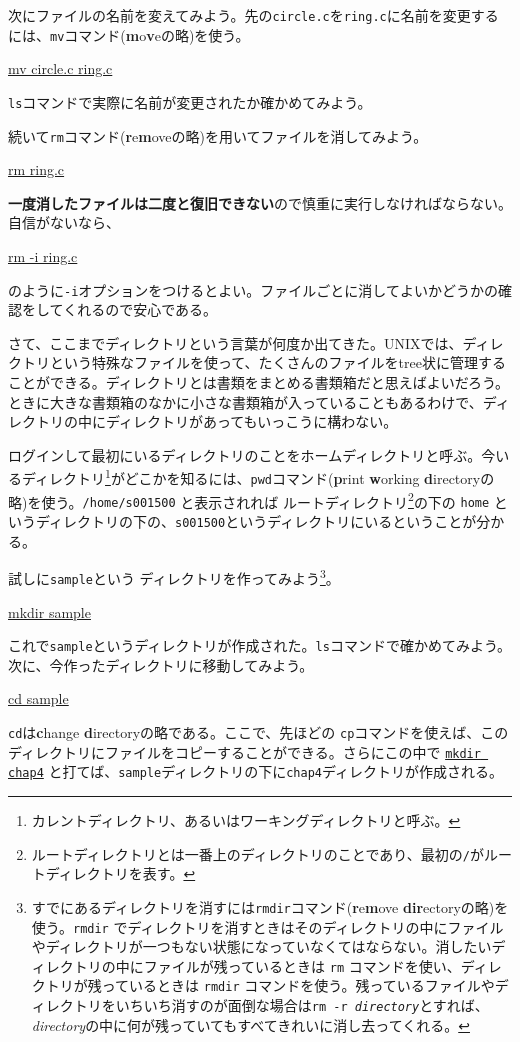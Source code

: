 次にファイルの名前を変えてみよう。先の{\tt circle.c}を{\tt ring.c}に名前を変更するには、{\tt mv}コマンド({\bf m}o{\bf v}eの略)を使う。
\begin{commandline2}
\prompt \underline{mv circle.c ring.c}
\end{commandline2} \noindent
{\tt ls}コマンドで実際に名前が変更されたか確かめてみよう。

続いて{\tt rm}コマンド({\bf r}e{\bf m}oveの略)を用いてファイルを消してみよう。
\begin{commandline2}
\prompt \underline{rm ring.c}
\end{commandline2} \noindent
{\bf 一度消したファイルは二度と復旧できない}ので慎重に実行しなければならない。自信がないなら、
\begin{commandline2}
\prompt \underline{rm -i ring.c}
\end{commandline2} \noindent
のように{\tt -i}オプションをつけるとよい。ファイルごとに消してよいかどうかの確認をしてくれるので安心である。

さて、ここまでディレクトリという言葉が何度か出てきた。UNIXでは、ディレクトリという特殊なファイルを使って、たくさんのファイルをtree状に管理することができる。ディレクトリとは書類をまとめる書類箱だと思えばよいだろう。ときに大きな書類箱のなかに小さな書類箱が入っていることもあるわけで、ディレクトリの中にディレクトリがあってもいっこうに構わない。

ログインして最初にいるディレクトリのことをホームディレクトリと呼ぶ。今いるディレクトリ\footnote{カレントディレクトリ、あるいはワーキングディレクトリと呼ぶ。}がどこかを知るには、{\tt pwd}コマンド({\bf p}rint {\bf w}orking {\bf d}irectoryの略)を使う。{\tt /home/s001500} と表示されれば ルートディレクトリ\footnote{ルートディレクトリとは一番上のディレクトリのことであり、最初の{\tt /}がルートディレクトリを表す。}の下の {\tt home} というディレクトリの下の、{\tt s001500}というディレクトリにいるということが分かる。

試しに{\tt sample}という ディレクトリを作ってみよう\footnote{すでにあるディレクトリを消すには{\tt rmdir}コマンド({\bf r}e{\bf m}ove {\bf dir}ectoryの略)を使う。{\tt rmdir} でディレクトリを消すときはそのディレクトリの中にファイルやディレクトリが一つもない状態になっていなくてはならない。消したいディレクトリの中にファイルが残っているときは {\tt rm} コマンドを使い、ディレクトリが残っているときは {\tt rmdir} コマンドを使う。残っているファイルやディレクトリをいちいち消すのが面倒な場合は{\tt rm -r {\it directory}}とすれば、{\it directory}の中に何が残っていてもすべてきれいに消し去ってくれる。}。
\begin{commandline2}
\prompt \underline{mkdir sample}
\end{commandline2} \noindent
これで{\tt sample}というディレクトリが作成された。{\tt ls}コマンドで確かめてみよう。次に、今作ったディレクトリに移動してみよう。
\begin{commandline2}
\prompt \underline{cd sample}
\end{commandline2} \noindent
{\tt cd}は{\bf c}hange {\bf d}irectoryの略である。ここで、先ほどの {\tt cp}コマンドを使えば、このディレクトリにファイルをコピーすることができる。さらにこの中で \underline{{\tt mkdir chap4}} と打てば、{\tt sample}ディレクトリの下に{\tt chap4}ディレクトリが作成される。

